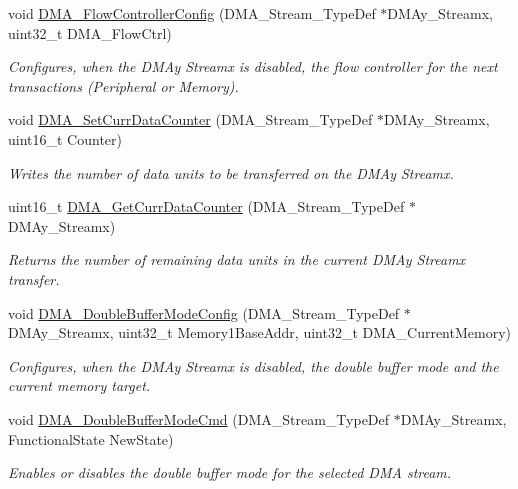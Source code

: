 \begin{DoxyCompactItemize}
void \hyperlink{group___d_m_a_ga77f7628f6be9d6d088127eceb090b8b2}{D\-M\-A\-\_\-\-Flow\-Controller\-Config} (D\-M\-A\-\_\-\-Stream\-\_\-\-Type\-Def $\ast$D\-M\-Ay\-\_\-\-Streamx, uint32\-\_\-t D\-M\-A\-\_\-\-Flow\-Ctrl)
\begin{DoxyCompactList}\small\item\em Configures, when the D\-M\-Ay Streamx is disabled, the flow controller for the next transactions (Peripheral or Memory). \end{DoxyCompactList}\item 
void \hyperlink{group___d_m_a_ga6a11a2c951cff59b125ba8857d44e3f3}{D\-M\-A\-\_\-\-Set\-Curr\-Data\-Counter} (D\-M\-A\-\_\-\-Stream\-\_\-\-Type\-Def $\ast$D\-M\-Ay\-\_\-\-Streamx, uint16\-\_\-t Counter)
\begin{DoxyCompactList}\small\item\em Writes the number of data units to be transferred on the D\-M\-Ay Streamx. \end{DoxyCompactList}\item 
uint16\-\_\-t \hyperlink{group___d_m_a_ga4a76444a92423f5f15a4328738d6dc46}{D\-M\-A\-\_\-\-Get\-Curr\-Data\-Counter} (D\-M\-A\-\_\-\-Stream\-\_\-\-Type\-Def $\ast$D\-M\-Ay\-\_\-\-Streamx)
\begin{DoxyCompactList}\small\item\em Returns the number of remaining data units in the current D\-M\-Ay Streamx transfer. \end{DoxyCompactList}\item 
void \hyperlink{group___d_m_a_ga8d0957e50302efaf48a16c62d14c9ca8}{D\-M\-A\-\_\-\-Double\-Buffer\-Mode\-Config} (D\-M\-A\-\_\-\-Stream\-\_\-\-Type\-Def $\ast$D\-M\-Ay\-\_\-\-Streamx, uint32\-\_\-t Memory1\-Base\-Addr, uint32\-\_\-t D\-M\-A\-\_\-\-Current\-Memory)
\begin{DoxyCompactList}\small\item\em Configures, when the D\-M\-Ay Streamx is disabled, the double buffer mode and the current memory target. \end{DoxyCompactList}\item 
void \hyperlink{group___d_m_a_ga7fe09e62ea3125db384829dab59ebe3e}{D\-M\-A\-\_\-\-Double\-Buffer\-Mode\-Cmd} (D\-M\-A\-\_\-\-Stream\-\_\-\-Type\-Def $\ast$D\-M\-Ay\-\_\-\-Streamx, Functional\-State New\-State)
\begin{DoxyCompactList}\small\item\em Enables or disables the double buffer mode for the selected D\-M\-A stream. \end{DoxyCompactList}\item 

\end{DoxyCompactItemize}

